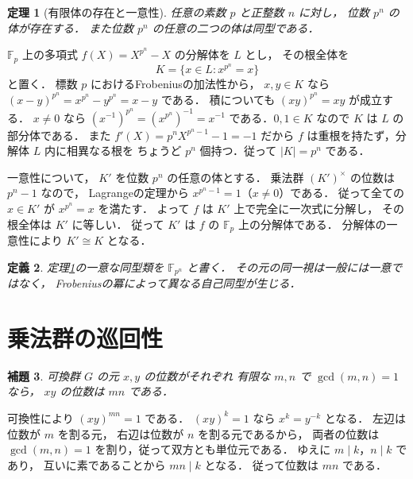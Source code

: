 \documentclass[a5paper,10pt,onecolumn]{jsarticle}
\makeatletter
\theoremstyle{mathnotetheorem}
\newtheorem{theorem}{定理}[section]
\newtheorem{definition}[theorem]{定義}
\newtheorem{lemma}[theorem]{補題}
\renewcommand{\proofname}{証明}
\renewenvironment{proof}[1][\proofname]{%
  \par\pushQED{\qed}\normalfont\topsep4\p@\@plus2\p@\relax
  \trivlist\item[\hskip\labelsep\bfseries #1]\ignorespaces
}{\popQED\endtrivlist\@endpefalse}
\makeatother
\begin{document}
\begin{theorem}[有限体の存在と一意性]\label{thm:finite-field}
任意の素数 $p$ と正整数 $n$ に対し，
位数 $p^n$ の体が存在する．
また位数 $p^n$ の任意の二つの体は同型である．
\end{theorem}
\begin{proof}
$\mathbb F_p$ 上の多項式
$f(X)=X^{p^n}-X$ の分解体を $L$ とし，
その根全体を
\[
 K=\{x\in L:x^{p^n}=x\}
\]
と置く．
標数 $p$ におけるFrobeniusの加法性から，
$x,y\in K$ なら
$(x-y)^{p^n}=x^{p^n}-y^{p^n}=x-y$ である．
積についても $(xy)^{p^n}=xy$ が成立する．
$x\ne0$ なら
$(x^{-1})^{p^n}=(x^{p^n})^{-1}=x^{-1}$
である．$0,1\in K$ なので $K$ は $L$ の部分体である．
また $f'(X)=p^nX^{p^n-1}-1=-1$ だから
$f$ は重根を持たず，分解体 $L$ 内に相異なる根を
ちょうど $p^n$ 個持つ．従って $|K|=p^n$ である．

一意性について，
$K'$ を位数 $p^n$ の任意の体とする．
乗法群 $(K')^\times$ の位数は $p^n-1$ なので，
Lagrangeの定理から
$x^{p^n-1}=1$（$x\ne0$）である．
従って全ての $x\in K'$ が $x^{p^n}=x$ を満たす．
よって $f$ は $K'$ 上で完全に一次式に分解し，
その根全体は $K'$ に等しい．
従って $K'$ は $f$ の $\mathbb F_p$ 上の分解体である．
分解体の一意性により $K'\cong K$ となる．
\end{proof}

\begin{definition}
定理\ref{thm:finite-field}の一意な同型類を
$\mathbb F_{p^n}$ と書く．
その元の同一視は一般には一意ではなく，
Frobeniusの冪によって異なる自己同型が生じる．
\end{definition}

\section{乗法群の巡回性}

\begin{lemma}\label{lem:order-coprime}
可換群 $G$ の元 $x,y$ の位数がそれぞれ
有限な $m,n$ で $\gcd(m,n)=1$ なら，
$xy$ の位数は $mn$ である．
\end{lemma}
\begin{proof}
可換性により $(xy)^{mn}=1$ である．
$(xy)^k=1$ なら $x^k=y^{-k}$ となる．
左辺は位数が $m$ を割る元，
右辺は位数が $n$ を割る元であるから，
両者の位数は $\gcd(m,n)=1$ を割り，従って双方とも単位元である．
ゆえに $m\mid k$，$n\mid k$ であり，
互いに素であることから $mn\mid k$ となる．
従って位数は $mn$ である．
\end{proof}
\end{document}
